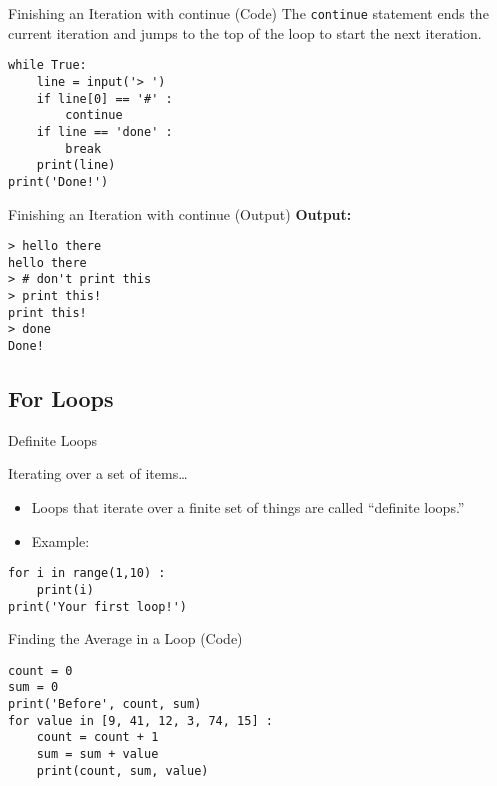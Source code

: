\documentclass[serif, aspectratio=169]{beamer}
\begin{document}
\begin{frame}[fragile]{Finishing an Iteration with continue (Code)}
    The \texttt{continue} statement ends the current iteration and jumps to the top of the loop to start the next iteration.

    \begin{lstlisting}
while True:
    line = input('> ')
    if line[0] == '#' :
        continue
    if line == 'done' :
        break
    print(line)
print('Done!')
    \end{lstlisting}
\end{frame}

\begin{frame}[fragile]{Finishing an Iteration with continue (Output)}
    \textbf{Output:}
    \begin{verbatim}
> hello there
hello there
> # don't print this
> print this!
print this!
> done
Done!
    \end{verbatim}
\end{frame}

\subsection{For Loops}

\begin{frame}[fragile]{Definite Loops}
    \begin{center}
        Iterating over a set of items…
    \end{center}

    \begin{itemize}
        \item Loops that iterate over a finite set of things are called “definite loops.”
        \item Example:
    \end{itemize}

    \begin{lstlisting}
for i in range(1,10) :
    print(i)
print('Your first loop!')
    \end{lstlisting}
\end{frame}

\begin{frame}[fragile]{Finding the Average in a Loop (Code)}
    \begin{lstlisting}
count = 0
sum = 0
print('Before', count, sum)
for value in [9, 41, 12, 3, 74, 15] :
    count = count + 1
    sum = sum + value
    print(count, sum, value)
    \end{lstlisting}
\end{frame}
\end{document}
